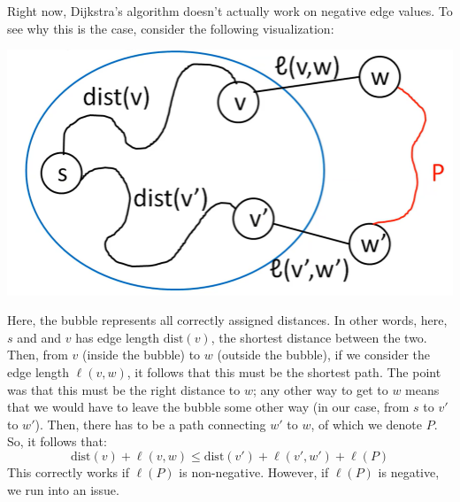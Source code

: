 \documentclass[letterpaper]{article}
\begin{document}
\bigskip 

Right now, Dijkstra's algorithm doesn't actually work on negative edge values. To see why this is the case, consider the following visualization: 
\begin{center}
    \includegraphics[scale=0.3]{../assets/neg_bubble.png}
\end{center}
Here, the bubble represents all correctly assigned distances. In other words, here, $s$ and and $v$ has edge length $\text{dist}(v)$, the shortest distance between the two. Then, from $v$ (inside the bubble) to $w$ (outside the bubble), if we consider the edge length $\ell(v, w)$, it follows that this must be the shortest path. The point was that this must be the right distance to $w$; any other way to get to $w$ means that we would have to leave the bubble some other way (in our case, from $s$ to $v'$ to $w'$). Then, there has to be a path connecting $w'$ to $w$, of which we denote $P$. So, it follows that:  
\[\text{dist}(v) + \ell(v, w) \leq \text{dist}(v') + \ell(v', w') + \ell(P)\]
This correctly works if $\ell(P)$ is non-negative. However, if $\ell(P)$ is negative, we run into an issue. 
\end{document}
